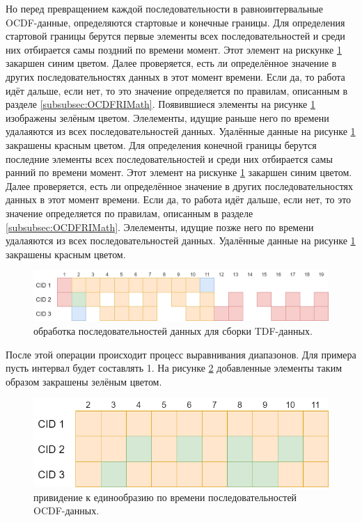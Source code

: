 {  \par Но перед превращением каждой последовательности в равноинтервальные OCDF-данные, определяются стартовые и конечные границы. Для определения стартовой границы берутся первые элементы всех последовательностей и среди них отбирается самы поздний по времени момент. Этот элемент на рискунке \ref{fig:CreateTDFstage2} закаршен синим цветом. Далее проверяется, есть ли определённое значение в других последовательностях данных в этот момент времени. Если да, то работа идёт дальше, если нет, то это значение определяется по правилам, описанным в разделе \ref{subsubsec:OCDFRIMath}. Появившиеся элементы на рисунке \ref{fig:CreateTDFstage2} изображены зелёным цветом. Элелементы, идущие раньше него по времени удалаяются из всех последовательностей данных. Удалённые данные на рисунке \ref{fig:CreateTDFstage2} закрашены красным цветом. Для определения конечной границы берутся последние элементы всех последовательностей и среди них отбирается самы ранний по времени момент. Этот элемент на рискунке \ref{fig:CreateTDFstage2} закаршен синим цветом. Далее проверяется, есть ли определённое значение в других последовательностях данных в этот момент времени. Если да, то работа идёт дальше, если нет, то это значение определяется по правилам, описанным в разделе \ref{subsubsec:OCDFRIMath}. Элелементы, идущие позже него по времени удалаяются из всех последовательностей данных. Удалённые данные на рисунке \ref{fig:CreateTDFstage2} закрашены красным цветом.
  
  \begin{figure}[H]
    \centering
    \includegraphics[width=\textwidth]{images/forDataManipulator/CreateTDFstage2.drawio.png}
    \caption{обработка последовательностей данных для сборки TDF-данных.} 
    \label{fig:CreateTDFstage2}
  \end{figure}

  \par После этой операции происходит процесс выравнивания диапазонов. Для примера пусть интервал будет составлять 1. На рисунке \ref{fig:CreateTDFstage3} добавленные элементы таким образом закрашены зелёным цветом. 

  \begin{figure}[H]
    \centering
    \includegraphics[width=\textwidth]{images/forDataManipulator/CreateTDFstage3.drawio.png}
    \caption{привидение к единообразию по времени последовательностей OCDF-данных.} 
    \label{fig:CreateTDFstage3}
  \end{figure}

}
